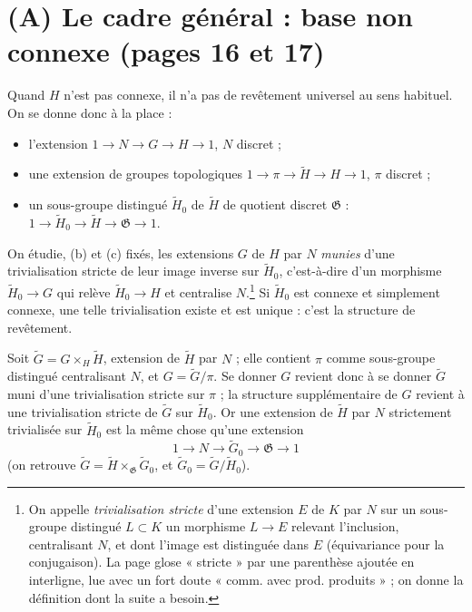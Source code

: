\documentclass[11pt,a4paper]{article}
\begin{document}
\section*{(A) Le cadre général : base non connexe (pages 16 et 17)}

Quand $H$ n'est pas connexe, il n'a pas de revêtement universel au sens
habituel. On se donne donc à la place :
\begin{itemize}
\item[(a)] l'extension $1 \to N \to G \to H \to 1$, $N$ discret ;
\item[(b)] une extension de groupes topologiques $1 \to \pi \to
\widetilde{H} \to H \to 1$, $\pi$ discret ;
\item[(c)] un sous-groupe distingué $\widetilde{H}_0$ de $\widetilde{H}$ de
quotient discret $\mathfrak{G}$ : $1 \to \widetilde{H}_0 \to \widetilde{H}
\to \mathfrak{G} \to 1$.
\end{itemize}
On étudie, (b) et (c) fixés, les extensions $G$ de $H$ par $N$ \emph{munies}
d'une trivialisation stricte de leur image inverse sur $\widetilde{H}_0$,
c'est-à-dire d'un morphisme $\widetilde{H}_0 \to G$ qui relève
$\widetilde{H}_0 \to H$ et centralise $N$.\footnote{On appelle
\emph{trivialisation stricte} d'une extension $E$ de $K$ par $N$ sur un
sous-groupe distingué $L \subset K$ un morphisme $L \to E$ relevant
l'inclusion, centralisant $N$, et dont l'image est distinguée dans $E$
(équivariance pour la conjugaison). La page glose « stricte » par une
parenthèse ajoutée en interligne, lue avec un fort doute « comm. avec prod.
produits » ; on donne la définition dont la suite a besoin.} Si
$\widetilde{H}_0$ est connexe et simplement connexe, une telle
trivialisation existe et est unique : c'est la structure de revêtement.

Soit $\widetilde{G} = G \times_H \widetilde{H}$, extension de $\widetilde{H}$
par $N$ ; elle contient $\pi$ comme sous-groupe distingué centralisant $N$, et
$G = \widetilde{G}/\pi$. Se donner $G$ revient donc à se donner
$\widetilde{G}$ muni d'une trivialisation stricte sur $\pi$ ; la structure
supplémentaire de $G$ revient à une trivialisation stricte de $\widetilde{G}$
sur $\widetilde{H}_0$. Or une extension de $\widetilde{H}$ par $N$
strictement trivialisée sur $\widetilde{H}_0$ est la même chose qu'une
extension
\[
  1 \longrightarrow N \longrightarrow \widetilde{G}_0 \longrightarrow
  \mathfrak{G} \longrightarrow 1
\]
(on retrouve $\widetilde{G} = \widetilde{H} \times_{\mathfrak{G}}
\widetilde{G}_0$, et $\widetilde{G}_0 = \widetilde{G} / \widetilde{H}_0$).
\end{document}
